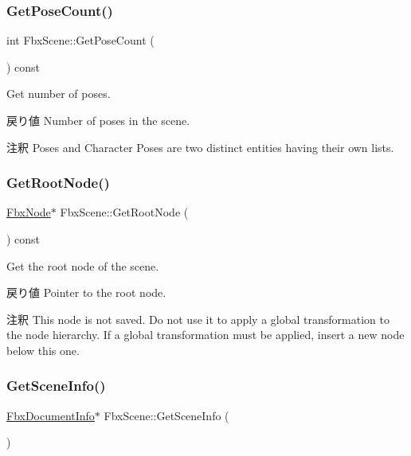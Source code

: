 \subsubsection{\texorpdfstring{Get\+Pose\+Count()}{GetPoseCount()}}
{\footnotesize\ttfamily int Fbx\+Scene\+::\+Get\+Pose\+Count (\begin{DoxyParamCaption}{ }\end{DoxyParamCaption}) const}

Get number of poses. \begin{DoxyReturn}{戻り値}
Number of poses in the scene. 
\end{DoxyReturn}
\begin{DoxyRemark}{注釈}
Poses and Character Poses are two distinct entities having their own lists. 
\end{DoxyRemark}
\mbox{\label{class_fbx_scene_ab27324d92595e85d18ec6749be79da09}} 
\subsubsection{\texorpdfstring{Get\+Root\+Node()}{GetRootNode()}}
{\footnotesize\ttfamily \hyperlink{class_fbx_node}{Fbx\+Node}$\ast$ Fbx\+Scene\+::\+Get\+Root\+Node (\begin{DoxyParamCaption}{ }\end{DoxyParamCaption}) const}

Get the root node of the scene. \begin{DoxyReturn}{戻り値}
Pointer to the root node. 
\end{DoxyReturn}
\begin{DoxyRemark}{注釈}
This node is not saved. Do not use it to apply a global transformation to the node hierarchy. If a global transformation must be applied, insert a new node below this one. 
\end{DoxyRemark}
\mbox{\label{class_fbx_scene_a5af52a77f2053fae74477261f857a0d8}} 
\subsubsection{\texorpdfstring{Get\+Scene\+Info()}{GetSceneInfo()}}
{\footnotesize\ttfamily \hyperlink{class_fbx_document_info}{Fbx\+Document\+Info}$\ast$ Fbx\+Scene\+::\+Get\+Scene\+Info (\begin{DoxyParamCaption}{ }\end{DoxyParamCaption})\hspace{0.3cm}{\ttfamily [inline]}}

